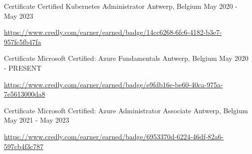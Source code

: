\begin{cventries}
  \cventry
    {Certificate} %
    {Certified Kubernetes Administrator} %
    {Antwerp, Belgium} %
    {May 2020 - May 2023} %
    {
      \begin{cvitems} %
        \item \url{https://www.credly.com/earner/earned/badge/14cc6268-6fc6-4182-b3e7-957fc5fb47fa}
      \end{cvitems}
    }

  \cventry
    {Certificate} %
    {Microsoft Certified: Azure Fundamentals} %
    {Antwerp, Belgium} %
    {May 2020 - PRESENT} %
    {
      \begin{cvitems} %
        \item \url{https://www.credly.com/earner/earned/badge/e9fdb16e-be60-40ca-975a-7e5613000da8}
      \end{cvitems}
    }

  \cventry
    {Certificate} %
    {Microsoft Certified: Azure Administrator Associate} %
    {Antwerp, Belgium} %
    {May 2021 - May 2023} %
    {
      \begin{cvitems} %
        \item \url{https://www.credly.com/earner/earned/badge/6953370d-6224-46df-82a6-597cb4f3c787}
      \end{cvitems}
    }

\end{cventries}
